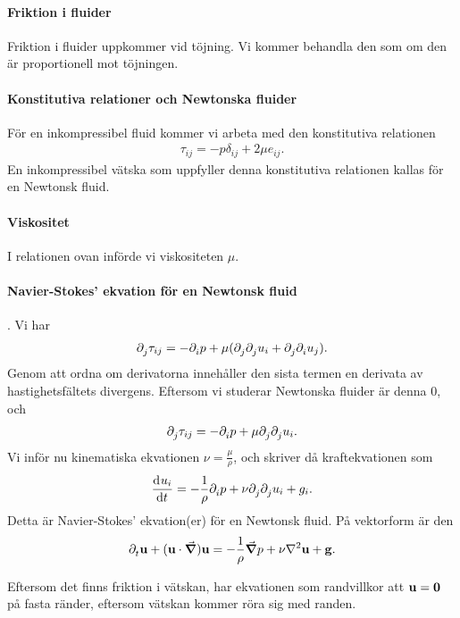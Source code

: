 \paragraph{Friktion i fluider}
Friktion i fluider uppkommer vid töjning. Vi kommer behandla den som om den är proportionell mot töjningen.

\paragraph{Konstitutiva relationer och Newtonska fluider}
För en inkompressibel fluid kommer vi arbeta med den konstitutiva relationen
\begin{align*}
	\tau_{ij} = -p\delta_{ij} + 2\mu e_{ij}.
\end{align*}
En inkompressibel vätska som uppfyller denna konstitutiva relationen kallas för en Newtonsk fluid.

\paragraph{Viskositet}
I relationen ovan införde vi viskositeten $\mu$.

\paragraph{Navier-Stokes' ekvation för en Newtonsk fluid}.
Vi har
\begin{align*}
	\partial_{j}^{}\tau_{ij} = -\partial_{i}^{}p + \mu(\partial_{j}^{}\partial_{j}^{}u_{i} + \partial_{j}^{}\partial_{i}^{}u_{j}).
\end{align*}
Genom att ordna om derivatorna innehåller den sista termen en derivata av hastighetsfältets divergens. Eftersom vi studerar Newtonska fluider är denna $0$, och
\begin{align*}
	\partial_{j}^{}\tau_{ij} = -\partial_{i}^{}p + \mu\partial_{j}^{}\partial_{j}^{}u_{i}.
\end{align*}
Vi inför nu kinematiska ekvationen $\nu = \frac{\mu}{\rho}$, och skriver då kraftekvationen som
\begin{align*}
	\dv[]{u_{i}}{t} = -\frac{1}{\rho}\partial_{i}^{}p + \nu\partial_{j}^{}\partial_{j}^{}u_{i} + g_{i}.
\end{align*}
Detta är Navier-Stokes' ekvation(er) för en Newtonsk fluid. På vektorform är den
\begin{align*}
	\del{t}{\vb{u}} + (\vb{u}\cdot\grad)\vb{u} = -\frac{1}{\rho}\grad{p} + \nu\laplacian{\vb{u}} + \vb{g}.
\end{align*}

Eftersom det finns friktion i vätskan, har ekvationen som randvillkor att $\vb{u} = \vb{0}$ på fasta ränder, eftersom vätskan kommer röra sig med randen.

